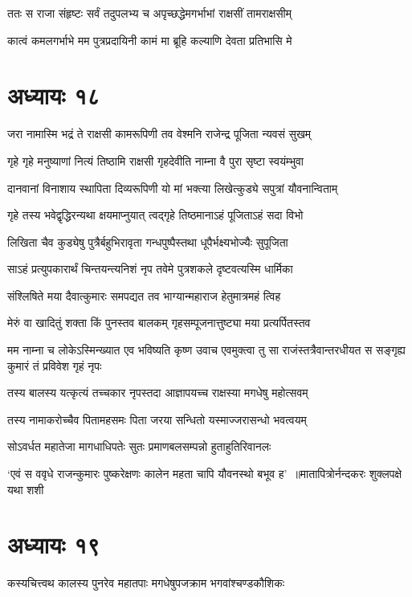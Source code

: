 \twolineshloka
{ततः स राजा संहृष्टः सर्वं तदुपलभ्य च}
{अपृच्छद्धेमगर्भाभां राक्षसीं तामराक्षसीम्}


\twolineshloka
{कात्वं कमलगर्भाभे मम पुत्रप्रदायिनी}
{कामं मा ब्रूहि कल्याणि देवता प्रतिभासि मे}


\chapter{अध्यायः १८}
\twolineshloka
{जरा नामास्मि भद्रं ते राक्षसी कामरूपिणी}
{तव वेश्मनि राजेन्द्र पूजिता न्यवसं सुखम्}


\twolineshloka
{गृहे गृहे मनुष्याणां नित्यं तिष्ठामि राक्षसी}
{गृहदेवीति नाम्ना वै पुरा सृष्टा स्वयंम्भुवा}


\twolineshloka
{दानवानां विनाशाय स्थापिता दिव्यरूपिणी}
{यो मां भक्त्या लिखेत्कुड्ये सपुत्रां यौवनान्विताम्}


\twolineshloka
{गृहे तस्य भवेद्वृद्धिरन्यथा क्षयमाप्नुयात्}
{त्वद्गृहे तिष्ठमानाऽहं पूजिताऽहं सदा विभो}


\twolineshloka
{लिखिता चैव कुड्येषु पुत्रैर्बहुभिरावृता}
{गन्धपुष्पैस्तथा धूपैर्भक्ष्यभोज्यैः सुपूजिता}


\threelineshloka
{साऽहं प्रत्युपकारार्थं चिन्तयन्त्यनिशं नृप}
{तवेमे पुत्रशकले दृष्टवत्यस्मि धार्मिका}
{}


\twolineshloka
{संश्लिषिते मया दैवात्कुमारः समपद्यत}
{तव भाग्यान्महाराज हेतुमात्रमहं त्विह}


\twolineshloka
{मेरुं वा खादितुं शक्ता किं पुनस्तव बालकम्}
{गृहसम्पूजनात्तुष्ट्या मया प्रत्यर्पितस्तव}


\fourlineindentedshloka
{मम नाम्ना च लोकेऽस्मिन्ख्यात एव भविष्यति}
{कृष्ण उवाच}
{एवमुक्त्वा तु सा राजंस्तत्रैवान्तरधीयत}
{स सङ्गृह्य कुमारं तं प्रविवेश गृहं नृपः}


\twolineshloka
{तस्य बालस्य यत्कृत्यं तच्चकार नृपस्तदा}
{आज्ञापयच्च राक्षस्या मगधेषु महोत्सवम्}


\twolineshloka
{तस्य नामाकरोच्चैव पितामहसमः पिता}
{जरया सन्धितो यस्माज्जरासन्धो भवत्वयम्}


\twolineshloka
{सोऽवर्धत महातेजा मागधाधिपतेः सुतः}
{प्रमाणबलसम्पन्नो हुताहुतिरिवानलः}


\twolineshloka
{`एवं स ववृधे राजन्कुमारः पुष्करेक्षणः}
{कालेन महता चापि यौवनस्थो बभूव ह' ॥मातापित्रोर्नन्दकरः शुक्लपक्षे यथा शशी}


\chapter{अध्यायः १९}
\twolineshloka
{कस्यचित्त्वथ कालस्य पुनरेव महातपाः}
{मगधेषुपजक्राम भगवांश्चण्डकौशिकः}


